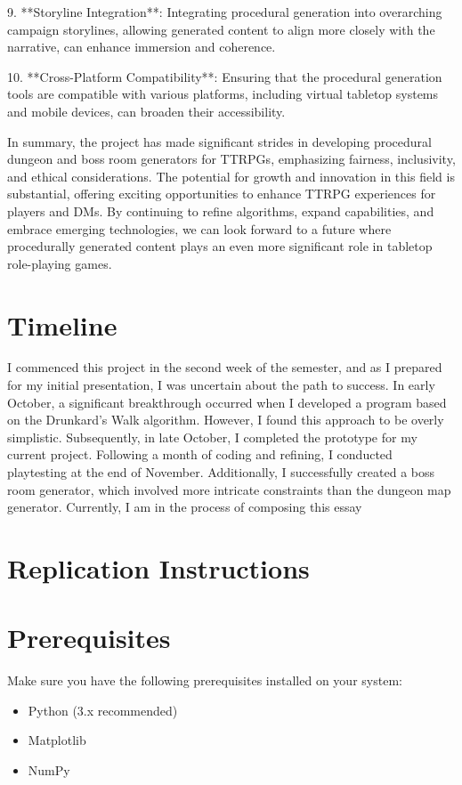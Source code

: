 \documentclass[10pt,twocolumn]{article}
\begin{document}
9. **Storyline Integration**: Integrating procedural generation into overarching campaign storylines, allowing generated content to align more closely with the narrative, can enhance immersion and coherence.

10. **Cross-Platform Compatibility**: Ensuring that the procedural generation tools are compatible with various platforms, including virtual tabletop systems and mobile devices, can broaden their accessibility.

In summary, the project has made significant strides in developing procedural dungeon and boss room generators for TTRPGs, emphasizing fairness, inclusivity, and ethical considerations. The potential for growth and innovation in this field is substantial, offering exciting opportunities to enhance TTRPG experiences for players and DMs. By continuing to refine algorithms, expand capabilities, and embrace emerging technologies, we can look forward to a future where procedurally generated content plays an even more significant role in tabletop role-playing games.


\section{Timeline}

I commenced this project in the second week of the semester, and as I prepared for my initial presentation, I was uncertain about the path to success. In early October, a significant breakthrough occurred when I developed a program based on the Drunkard's Walk algorithm. However, I found this approach to be overly simplistic. Subsequently, in late October, I completed the prototype for my current project. Following a month of coding and refining, I conducted playtesting at the end of November. Additionally, I successfully created a boss room generator, which involved more intricate constraints than the dungeon map generator. Currently, I am in the process of composing this essay

\section{Replication Instructions}
\section{Prerequisites}

Make sure you have the following prerequisites installed on your system:

\begin{itemize}
    \item Python (3.x recommended)
    \item Matplotlib
    \item NumPy
\end{itemize}
\end{document}

